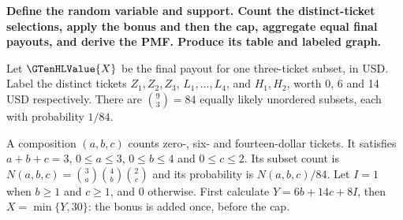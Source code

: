 \noindent\textbf{\boldmath Define the random variable and support. Count the distinct-ticket selections, apply the bonus and then the cap, aggregate equal final payouts, and derive the PMF. Produce its table and labeled graph.}\par\nopagebreak

Let $\GTenHLValue{X}$ be the final payout for one three-ticket subset, in USD. Label the distinct tickets $Z_1,Z_2,Z_3$, $L_1,\ldots,L_4$, and $H_1,H_2$, worth 0, 6 and 14 USD respectively. There are $\binom93=84$ equally likely unordered subsets, each with probability $1/84$.

A composition $(a,b,c)$ counts zero-, six- and fourteen-dollar tickets. It satisfies $a+b+c=3$, $0\leq a\leq3$, $0\leq b\leq4$ and $0\leq c\leq2$. Its subset count is $N(a,b,c)=\binom3a\binom4b\binom2c$ and its probability is $N(a,b,c)/84$. Let $I=1$ when $b\geq1$ and $c\geq1$, and 0 otherwise. First calculate $Y=6b+14c+8I$, then $X=\min\{Y,30\}$: the bonus is added once, before the cap.
\begingroup\renewcommand{\arraystretch}{1.35}

